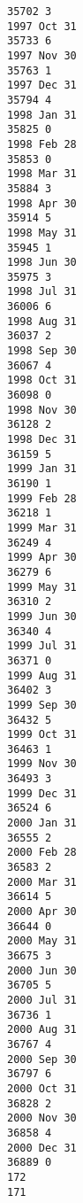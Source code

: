 \documentclass[11pt]{article}
\begin{document}
\begin{Verbatim}[commandchars=\\\{\}]
35702 3
1997 Oct 31
35733 6
1997 Nov 30
35763 1
1997 Dec 31
35794 4
1998 Jan 31
35825 0
1998 Feb 28
35853 0
1998 Mar 31
35884 3
1998 Apr 30
35914 5
1998 May 31
35945 1
1998 Jun 30
35975 3
1998 Jul 31
36006 6
1998 Aug 31
36037 2
1998 Sep 30
36067 4
1998 Oct 31
36098 0
1998 Nov 30
36128 2
1998 Dec 31
36159 5
1999 Jan 31
36190 1
1999 Feb 28
36218 1
1999 Mar 31
36249 4
1999 Apr 30
36279 6
1999 May 31
36310 2
1999 Jun 30
36340 4
1999 Jul 31
36371 0
1999 Aug 31
36402 3
1999 Sep 30
36432 5
1999 Oct 31
36463 1
1999 Nov 30
36493 3
1999 Dec 31
36524 6
2000 Jan 31
36555 2
2000 Feb 28
36583 2
2000 Mar 31
36614 5
2000 Apr 30
36644 0
2000 May 31
36675 3
2000 Jun 30
36705 5
2000 Jul 31
36736 1
2000 Aug 31
36767 4
2000 Sep 30
36797 6
2000 Oct 31
36828 2
2000 Nov 30
36858 4
2000 Dec 31
36889 0
172
171

    \end{Verbatim}


    
    
    
    
\end{document}

